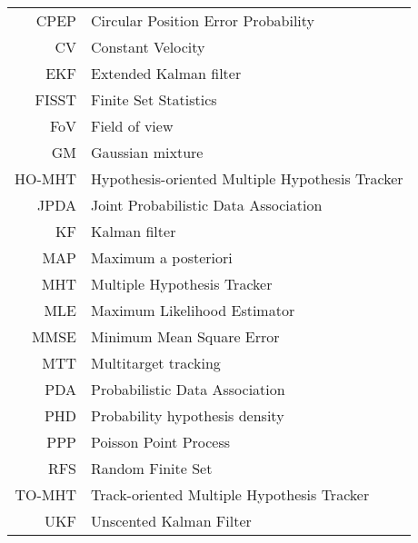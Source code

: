 \begin{tabular}{rl}
CPEP & Circular Position Error Probability \\
CV & Constant Velocity \\
EKF & Extended Kalman filter \\
FISST & Finite Set Statistics \\
FoV & Field of view \\
GM & Gaussian mixture \\
HO-MHT & Hypothesis-oriented Multiple Hypothesis Tracker \\
JPDA & Joint Probabilistic Data Association \\
KF & Kalman filter \\
MAP & Maximum a posteriori \\
MHT & Multiple Hypothesis Tracker \\
MLE & Maximum Likelihood Estimator \\
MMSE & Minimum Mean Square Error \\
MTT & Multitarget tracking \\
PDA & Probabilistic Data Association \\
PHD & Probability hypothesis density \\
PPP & Poisson Point Process \\
RFS & Random Finite Set \\
TO-MHT & Track-oriented Multiple Hypothesis Tracker \\
UKF & Unscented Kalman Filter \\
\end{tabular}
